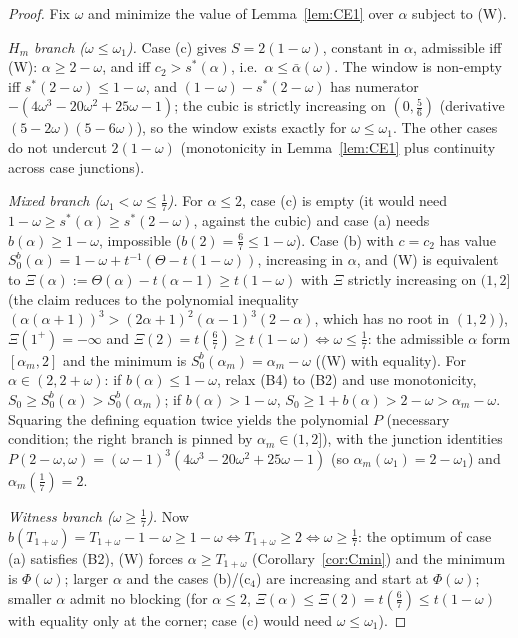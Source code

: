\documentclass[11pt]{article}
\theoremstyle{definition}
\begin{document}
\begin{proof}
Fix $\omega$ and minimize the value of Lemma~\ref{lem:CE1} over $\alpha$
subject to (W).

\emph{$H_m$ branch ($\omega\le\omega_1$).} Case (c) gives $S=2(1-\omega)$,
constant in $\alpha$, admissible iff (W): $\alpha\ge2-\omega$, and iff
$c_2>s^*(\alpha)$, i.e.\ $\alpha\le\bar\alpha(\omega)$. The window is
non-empty iff $s^*(2-\omega)\le1-\omega$, and
$(1-\omega)-s^*(2-\omega)$ has numerator
$-(4\omega^3-20\omega^2+25\omega-1)$; the cubic is strictly increasing on
$(0,\tfrac56)$ (derivative $(5-2\omega)(5-6\omega)$), so the window exists
exactly for $\omega\le\omega_1$. The other cases do not undercut
$2(1-\omega)$ (monotonicity in Lemma~\ref{lem:CE1} plus continuity across
case junctions).

\emph{Mixed branch ($\omega_1<\omega\le\tfrac17$).} For $\alpha\le2$, case
(c) is empty (it would need $1-\omega\ge s^*(\alpha)\ge s^*(2-\omega)$,
against the cubic) and case (a) needs $b(\alpha)\ge1-\omega$, impossible
($b(2)=\tfrac67\le1-\omega$). Case (b) with $c=c_2$ has value
$S_0^b(\alpha)=1-\omega+t^{-1}(\Theta-t(1-\omega))$, increasing in $\alpha$,
and (W) is equivalent to
$\Xi(\alpha):=\Theta(\alpha)-t(\alpha-1)\ge t(1-\omega)$ with $\Xi$
strictly increasing on $(1,2]$ (the claim reduces to the polynomial
inequality $(\alpha(\alpha+1))^3>(2\alpha+1)^2(\alpha-1)^3(2-\alpha)$,
which has no root in $(1,2)$), $\Xi(1^+)=-\infty$ and
$\Xi(2)=t(\tfrac67)\ge t(1-\omega)\iff\omega\le\tfrac17$: the admissible
$\alpha$ form $[\alpha_m,2]$ and the minimum is
$S_0^b(\alpha_m)=\alpha_m-\omega$ ((W) with equality). For
$\alpha\in(2,2+\omega)$: if $b(\alpha)\le1-\omega$, relax (B4) to (B2) and
use monotonicity, $S_0\ge S_0^b(\alpha)>S_0^b(\alpha_m)$; if $b(\alpha)>1-\omega$,
$S_0\ge1+b(\alpha)>2-\omega>\alpha_m-\omega$. Squaring the defining equation
twice yields the polynomial $P$ (necessary condition; the right branch is
pinned by $\alpha_m\in(1,2]$), with the junction identities
$P(2-\omega,\omega)=(\omega-1)^3(4\omega^3-20\omega^2+25\omega-1)$ (so
$\alpha_m(\omega_1)=2-\omega_1$) and $\alpha_m(\tfrac17)=2$.

\emph{Witness branch ($\omega\ge\tfrac17$).} Now
$b(T_{1+\omega})=T_{1+\omega}-1-\omega\ge1-\omega\iff T_{1+\omega}\ge2
\iff\omega\ge\tfrac17$: the optimum of case (a) satisfies (B2), (W) forces
$\alpha\ge T_{1+\omega}$ (Corollary~\ref{cor:Cmin}) and the minimum is
$\Phi(\omega)$; larger $\alpha$ and the cases (b)/(c$_4$) are increasing
and start at $\Phi(\omega)$; smaller $\alpha$ admit no blocking (for
$\alpha\le2$, $\Xi(\alpha)\le\Xi(2)=t(\tfrac67)\le t(1-\omega)$ with
equality only at the corner; case (c) would need $\omega\le\omega_1$).
\end{proof}
\end{document}
